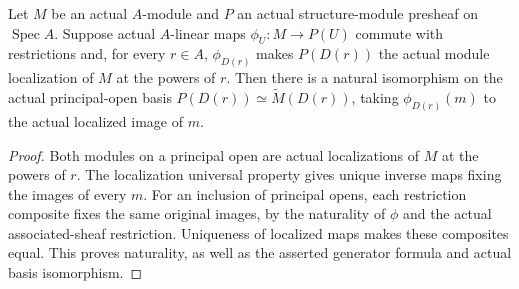 \begin{theorem}
\label{sc0-canonical-port:geom:affine-localized-basis-comparison}
\leanok
Let \(M\) be an actual \(A\)-module and \(P\) an
actual structure-module presheaf on \(\operatorname{Spec}A\).
Suppose actual \(A\)-linear maps \(\phi_U:M\to P(U)\)
commute with restrictions and, for every \(r\in A\),
\(\phi_{D(r)}\) makes \(P(D(r))\) the actual module
localization of \(M\) at the powers of \(r\).
Then there is a natural isomorphism on the actual
principal-open basis
\(P(D(r))\simeq\widetilde M(D(r))\), taking
\(\phi_{D(r)}(m)\) to the actual localized image of \(m\).
\end{theorem}
\begin{proof}
Both modules on a principal open are actual localizations
of \(M\) at the powers of \(r\). The localization
universal property gives unique inverse maps fixing
the images of every \(m\). For an inclusion of
principal opens, each restriction composite fixes the
same original images, by the naturality of \(\phi\)
and the actual associated-sheaf restriction. Uniqueness
of localized maps makes these composites equal. This
proves naturality, as well as the asserted generator
formula and actual basis isomorphism.
\end{proof}

